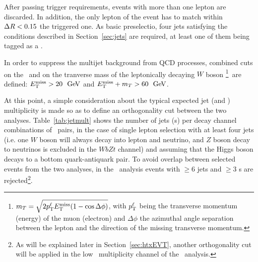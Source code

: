 After passing trigger requirements, events with more than one lepton are
discarded. In addition, the only lepton of the event has to match within $\dr<0.15$ the
triggered one. As basic preselectio, four jets satisfying the conditions
described in Section~\ref{sec:jets} are required, at least one of them
being tagged as a \bjet.

In order to suppress the multijet background from QCD processes,
combined cuts on the \met\ and on the tranverse mass of the 
leptonically decaying $W$ boson \mt\footnote{$\mt = \sqrt{2 p^\ell_{\rm T} \met (1-\cos\Delta\phi)}$, with
$p^\ell_{\rm T}$  being the transverse momentum (energy) of the muon (electron) and $\Delta\phi$ the
azimuthal angle separation between the lepton and the direction of
the missing transverse momentum.}\ 
are defined: $\met>20~\gev$ and $\met+\mt>60~\gev$.

At this point, a simple consideration about the typical expected jet
(and \bjet) multiplicity is made so as to define an orthogonality
cut between the two analyses. Table~\ref{tab:jetmult} shows the 
number of jets (\bjet s) per decay channel combinations of \TTbar\ pairs, 
in the case of single lepton selection with at least four jets
(i.e. one $W$ boson will always decay into lepton and neutrino,
and $Z$ boson decay to neutrinos is excluded in the $WbZt$ channel) and assuming that
the Higgs boson decays to a bottom quark-antiquark pair.
To avoid overlap between selected events from the two analyses, in the
\wbx\ analysis events with $\geq$6 jets and $\geq$3 \bjet s are 
rejected\footnote{As will be explained later in Section~\ref{sec:htxEVT}, another orthogonality
cut will be applied in the low \bjet\ multiplicity channel of the \htx\ analysis.}.


